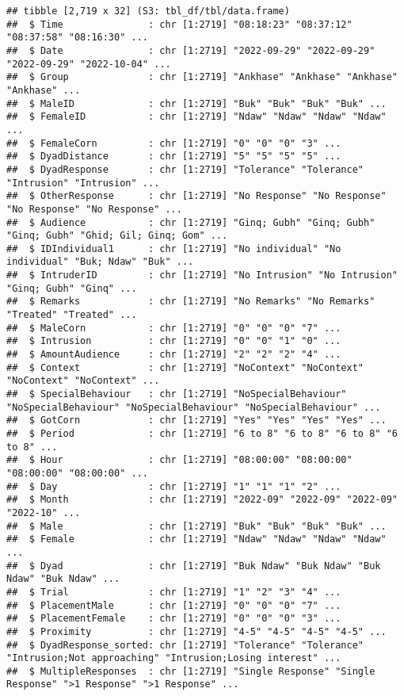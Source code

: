 \documentclass[
]{article}
\begin{document}
\begin{verbatim}
## tibble [2,719 x 32] (S3: tbl_df/tbl/data.frame)
##  $ Time               : chr [1:2719] "08:18:23" "08:37:12" "08:37:58" "08:16:30" ...
##  $ Date               : chr [1:2719] "2022-09-29" "2022-09-29" "2022-09-29" "2022-10-04" ...
##  $ Group              : chr [1:2719] "Ankhase" "Ankhase" "Ankhase" "Ankhase" ...
##  $ MaleID             : chr [1:2719] "Buk" "Buk" "Buk" "Buk" ...
##  $ FemaleID           : chr [1:2719] "Ndaw" "Ndaw" "Ndaw" "Ndaw" ...
##  $ FemaleCorn         : chr [1:2719] "0" "0" "0" "3" ...
##  $ DyadDistance       : chr [1:2719] "5" "5" "5" "5" ...
##  $ DyadResponse       : chr [1:2719] "Tolerance" "Tolerance" "Intrusion" "Intrusion" ...
##  $ OtherResponse      : chr [1:2719] "No Response" "No Response" "No Response" "No Response" ...
##  $ Audience           : chr [1:2719] "Ginq; Gubh" "Ginq; Gubh" "Ginq; Gubh" "Ghid; Gil; Ginq; Gom" ...
##  $ IDIndividual1      : chr [1:2719] "No individual" "No individual" "Buk; Ndaw" "Buk" ...
##  $ IntruderID         : chr [1:2719] "No Intrusion" "No Intrusion" "Ginq; Gubh" "Ginq" ...
##  $ Remarks            : chr [1:2719] "No Remarks" "No Remarks" "Treated" "Treated" ...
##  $ MaleCorn           : chr [1:2719] "0" "0" "0" "7" ...
##  $ Intrusion          : chr [1:2719] "0" "0" "1" "0" ...
##  $ AmountAudience     : chr [1:2719] "2" "2" "2" "4" ...
##  $ Context            : chr [1:2719] "NoContext" "NoContext" "NoContext" "NoContext" ...
##  $ SpecialBehaviour   : chr [1:2719] "NoSpecialBehaviour" "NoSpecialBehaviour" "NoSpecialBehaviour" "NoSpecialBehaviour" ...
##  $ GotCorn            : chr [1:2719] "Yes" "Yes" "Yes" "Yes" ...
##  $ Period             : chr [1:2719] "6 to 8" "6 to 8" "6 to 8" "6 to 8" ...
##  $ Hour               : chr [1:2719] "08:00:00" "08:00:00" "08:00:00" "08:00:00" ...
##  $ Day                : chr [1:2719] "1" "1" "1" "2" ...
##  $ Month              : chr [1:2719] "2022-09" "2022-09" "2022-09" "2022-10" ...
##  $ Male               : chr [1:2719] "Buk" "Buk" "Buk" "Buk" ...
##  $ Female             : chr [1:2719] "Ndaw" "Ndaw" "Ndaw" "Ndaw" ...
##  $ Dyad               : chr [1:2719] "Buk Ndaw" "Buk Ndaw" "Buk Ndaw" "Buk Ndaw" ...
##  $ Trial              : chr [1:2719] "1" "2" "3" "4" ...
##  $ PlacementMale      : chr [1:2719] "0" "0" "0" "7" ...
##  $ PlacementFemale    : chr [1:2719] "0" "0" "0" "3" ...
##  $ Proximity          : chr [1:2719] "4-5" "4-5" "4-5" "4-5" ...
##  $ DyadResponse_sorted: chr [1:2719] "Tolerance" "Tolerance" "Intrusion;Not approaching" "Intrusion;Losing interest" ...
##  $ MultipleResponses  : chr [1:2719] "Single Response" "Single Response" ">1 Response" ">1 Response" ...
\end{verbatim}
\end{document}
